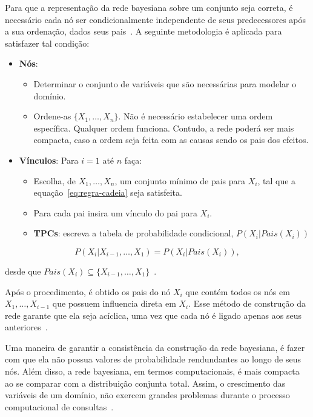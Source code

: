 Para que a representação da rede bayesiana sobre um conjunto seja correta, é necessário cada nó ser condicionalmente independente de seus predecessores após a sua ordenação, dados seus pais~\cite{russell:2002}. A seguinte metodologia é aplicada para satisfazer tal condição:

\begin{itemize}
    \item \textbf{Nós}:
    \begin{itemize}
        \item Determinar o conjunto de variáveis que são necessárias para modelar o domínio.
        \item Ordene-as $\{ X_1, \dots, X_n\}$. Não é necessário estabelecer uma ordem específica. Qualquer ordem funciona. Contudo, a rede poderá ser mais compacta, caso a ordem seja feita com as causas sendo os pais dos efeitos.
    \end{itemize}
    \item \textbf{Vínculos}: Para $i = 1$ até $n$ faça:
    \begin{itemize}
        \item Escolha, de $X_1, \dots, X_n$, um conjunto mínimo de pais para $X_i$, tal que a equação~\ref{eq:regra-cadeia} seja satisfeita.
        \item Para cada pai insira um vínculo do pai para $X_i$.
        \item \textbf{TPCs}: escreva a tabela de probabilidade condicional, $P(X_i|Pais(X_i))$
    \end{itemize}
\end{itemize}

\begin{equation}
    \label{eq:regra-cadeia}
    P(X_i|X_{i-1},\dots,X_1) = P(X_i|Pais(X_i)),
\end{equation}

desde que $Pais(X_i) \subseteq \{X_{i-1},\dots,X_1\}$~\cite{russell:2002}.

Após o procedimento, é obtido os pais do nó $X_i$ que contém todos os nós em $X_1, \dots, X_{i-1}$ que possuem influencia direta em $X_i$. Esse método de construção da rede garante que ela seja acíclica, uma vez que cada nó é ligado apenas aos seus anteriores~\cite{russell:2002}.

Uma maneira de garantir a consistência da construção da rede bayesiana, é fazer com que ela não possua valores de probabilidade rendundantes ao longo de seus nós. Além disso, a rede bayesiana, em termos computacionais, é mais compacta ao se comparar com a distribuição conjunta total. Assim, o crescimento das variáveis de um domínio, não exercem grandes problemas durante o processo computacional de consultas~\cite{russell:2002}.

